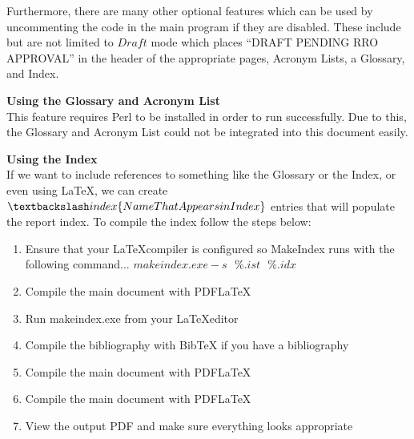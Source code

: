 Furthermore, there are many other optional features which can be used by uncommenting the code in the main program if they are disabled. These include but are not limited to $Draft$ mode which places ``DRAFT PENDING RRO APPROVAL'' in the header of the appropriate pages, Acronym Lists, a Glossary, and Index.

\textbf{Using the Glossary and Acronym List}\\
This feature requires Perl to be installed in order to run successfully. Due to this, the Glossary and Acronym List could not be integrated into this document easily.

\textbf{Using the Index}\\
If we want to include references to something like the Glossary or the Index, or even using \LaTeX{}, we can create $\textbackslash index\{Name That Appears in Index\}$ entries that will populate the report index. To compile the index follow the steps below:
\begin{enumerate}
\item Ensure that your \LaTeX\space compiler is configured so MakeIndex runs with the following command... $makeindex.exe -s\mbox{ }\%.ist\mbox{ }\%.idx$
\item Compile the main document with PDFLaTeX
\item Run makeindex.exe from your \LaTeX\space editor
\item Compile the bibliography with BibTeX if you have a bibliography
\item Compile the main document with PDFLaTeX
\item Compile the main document with PDFLaTeX
\item View the output PDF and make sure everything looks appropriate
\end{enumerate}